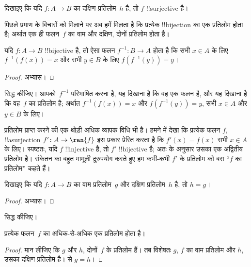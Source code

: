 \documentclass[../../../include/open-logic-section]{subfiles}
\begin{document}
\begin{prob}
दिखाइए कि यदि $f\colon A \to B$ का दक्षिण प्रतिलोम~$h$ है, तो $f$
!!{surjective} है।
\end{prob}

\begin{explain}
  पिछले प्रमाण के विचारों को मिलाने पर अब हमें मिलता है कि प्रत्येक
  !!{bijection} का एक प्रतिलोम होता है; अर्थात एक ही फलन~$f$ का वाम और
  दक्षिण, दोनों प्रतिलोम होता है।
\end{explain}

\begin{prop}
यदि $f\colon A \to B$ !!{bijective} है, तो ऐसा फलन
$f^{-1}\colon B \to A$ होता है कि सभी $x \in A$ के लिए
$f^{-1}(f(x)) = x$ और सभी $y \in B$ के लिए $f(f^{-1}(y)) = y$।
\end{prop}

\begin{proof}
अभ्यास।
\end{proof}

\begin{prob}
 सिद्ध कीजिए। आपको~$f^{-1}$
परिभाषित करना है, यह दिखाना है कि वह एक फलन है, और यह दिखाना है कि वह~$f$
का प्रतिलोम है; अर्थात $f^{-1}(f(x)) = x$ और $f(f^{-1}(y)) = y$, सभी
$x \in A$ और $y \in B$ के लिए।
\end{prob}

\begin{explain}
प्रतिलोम प्राप्त करने की एक थोड़ी अधिक व्यापक विधि भी है। हमने
 में देखा कि प्रत्येक फलन $f$, !!a{surjection} $f'
\colon A \to \ran{f}$ इस प्रकार प्रेरित करता है कि $f'(x) = f(x)$ सभी
$x \in A$ के लिए। स्पष्टतः, यदि $f$ !!{injective} है,
तो $f'$ !!{bijective} है; अतः  के अनुसार उसका
एक अद्वितीय प्रतिलोम है। संकेतन का बहुत मामूली दुरुपयोग करते हुए हम कभी-कभी
$f'$ के प्रतिलोम को बस “$f$ का प्रतिलोम” कहते हैं।
\end{explain}

\begin{prop}%
  दिखाइए कि यदि $f\colon A \to B$ का वाम प्रतिलोम~$g$ और दक्षिण
  प्रतिलोम~$h$ है, तो $h = g$।
\end{prop}

\begin{proof}
  अभ्यास।
\end{proof}

\begin{prob}
   सिद्ध कीजिए।
\end{prob}

\begin{prop}
प्रत्येक फलन~$f$ का अधिक-से-अधिक एक प्रतिलोम होता है।
\end{prop}

\begin{proof}
  मान लीजिए कि $g$ और $h$, दोनों~$f$ के प्रतिलोम हैं। तब विशेषतः $g$,
  $f$ का वाम प्रतिलोम और $h$, उसका दक्षिण प्रतिलोम है।
   से $g = h$।
\end{proof}
\end{document}
